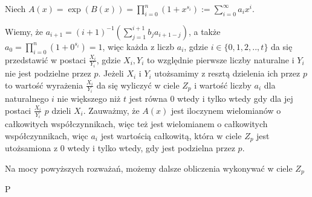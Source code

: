 \documentclass{article}
\begin{document}
Niech $A(x)=\exp(B(x))=\prod_{i=0}^n(1+x^{s_i}):=\sum_{i=0}^{\infty}a_ix^i$.

Wiemy, że $a_{i+1}=(i+1)^{-1}(\sum_{j=1}^{i+1}b_ja_{i+1-j})$, a także $a_0=\prod_{i=0}^n(1+0^{s_i})=1$, więc każda
z liczb $a_i$, gdzie $i \in \{0,1,2,..,t \}$ da się przedstawić w postaci $\frac{X_i}{Y_i}$, gdzie $X_i,Y_i$ to
względnie pierwsze liczby naturalne i $Y_i$ nie jest podzielne przez $p$. Jeżeli $X_i$ i $Y_i$ utożsamimy z resztą dzielenia ich 
przez $p$ to wartość wyrażenia $\frac{X_i}{Y_i}$ da się wyliczyć w ciele $Z_p$ i wartość liczby $a_i$ dla naturalnego $i$
nie większego niż $t$ jest równa $0$ wtedy i tylko wtedy gdy dla jej postaci $\frac{X_i}{Y_i}$ $p$ dzieli $X_i$. Zauważmy,
że $A(x)$ jest iloczynem wielomianów o całkowitych współczynnikach, więc też jest wielomianem o całkowitych współczynnikach,
więc $a_i$ jest wartością całkowitą, która w ciele $Z_p$ jest utożsamiona z $0$ wtedy i tylko wtedy, gdy jest podzielna przez $p$.

Na mocy powyższych rozważań, możemy dalsze obliczenia wykonywać w ciele $Z_p$

P
\end{document}
